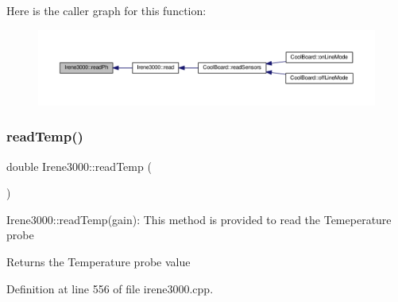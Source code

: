 Here is the caller graph for this function\+:\nopagebreak
\begin{figure}[H]
\begin{center}
\leavevmode
\includegraphics[width=350pt]{d6/d03/class_irene3000_a436fc0a06681cd0784aba56b9707f19a_icgraph}
\end{center}
\end{figure}
\mbox{\label{class_irene3000_a80bc6dfea106dc3bc54fa20204d4d5dc}} 
\subsubsection{\texorpdfstring{read\+Temp()}{readTemp()}}
{\footnotesize\ttfamily double Irene3000\+::read\+Temp (\begin{DoxyParamCaption}{ }\end{DoxyParamCaption})}

Irene3000\+::read\+Temp(gain)\+: This method is provided to read the Temeperature probe

\begin{DoxyReturn}{Returns}
the Temperature probe value 
\end{DoxyReturn}


Definition at line 556 of file irene3000.\+cpp.


